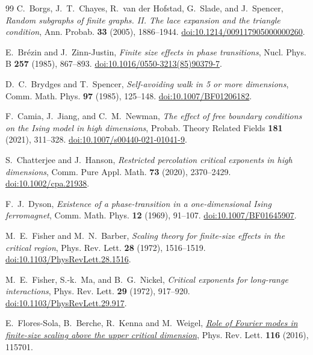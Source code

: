 \documentclass[11pt]{article}
\theoremstyle{definition}
\begin{document}
\begin{thebibliography}{99}
C.~Borgs, J.~T.~Chayes, R.~van der Hofstad, G.~Slade, and J.~Spencer,
\emph{Random subgraphs of finite graphs. II. The lace expansion and the
triangle condition}, Ann. Probab. \textbf{33} (2005), 1886--1944.
\href{https://doi.org/10.1214/009117905000000260}{doi:10.1214/009117905000000260}.

E.~Br\'ezin and J.~Zinn-Justin, \emph{Finite size effects in phase transitions},
Nucl. Phys. B \textbf{257} (1985), 867--893.
\href{https://doi.org/10.1016/0550-3213(85)90379-7}{doi:10.1016/0550-3213(85)90379-7}.

D.~C.~Brydges and T.~Spencer, \emph{Self-avoiding walk in 5 or more
dimensions}, Comm. Math. Phys. \textbf{97} (1985), 125--148.
\href{https://doi.org/10.1007/BF01206182}{doi:10.1007/BF01206182}.

F.~Camia, J.~Jiang, and C.~M.~Newman,
\emph{The effect of free boundary conditions on the Ising model in high
dimensions}, Probab. Theory Related Fields \textbf{181} (2021), 311--328.
\href{https://doi.org/10.1007/s00440-021-01041-9}{doi:10.1007/s00440-021-01041-9}.

S.~Chatterjee and J.~Hanson, \emph{Restricted percolation critical
exponents in high dimensions},
Comm. Pure Appl. Math. \textbf{73} (2020), 2370--2429.
\href{https://doi.org/10.1002/cpa.21938}{doi:10.1002/cpa.21938}.

F.~J.~Dyson, \emph{Existence of a phase-transition in a one-dimensional
Ising ferromagnet}, Comm. Math. Phys. \textbf{12} (1969), 91--107.
\href{https://doi.org/10.1007/BF01645907}{doi:10.1007/BF01645907}.

M.~E.~Fisher and M.~N.~Barber, \emph{Scaling theory for finite-size effects
in the critical region}, Phys. Rev. Lett. \textbf{28} (1972), 1516--1519.
\href{https://doi.org/10.1103/PhysRevLett.28.1516}{doi:10.1103/PhysRevLett.28.1516}.

M.~E.~Fisher, S.-k.~Ma, and B.~G.~Nickel, \emph{Critical exponents for
long-range interactions}, Phys. Rev. Lett. \textbf{29} (1972), 917--920.
\href{https://doi.org/10.1103/PhysRevLett.29.917}{doi:10.1103/PhysRevLett.29.917}.

E.~Flores-Sola, B.~Berche, R.~Kenna and M.~Weigel,
\href{https://doi.org/10.1103/PhysRevLett.116.115701}
{\emph{Role of Fourier modes in finite-size scaling above the upper
critical dimension}}, Phys. Rev. Lett. \textbf{116} (2016), 115701.


\end{thebibliography}
\end{document}
